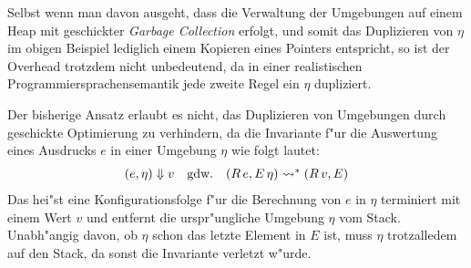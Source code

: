 \documentclass[12pt,a4paper]{article}
\begin{document}
Selbst wenn man davon ausgeht, dass die Verwaltung der Umgebungen auf einem Heap mit geschickter \emph{Garbage
Collection} erfolgt, und somit das Duplizieren von $\eta$ im obigen Beispiel lediglich einem Kopieren eines
Pointers entspricht, so ist der Overhead trotzdem nicht unbedeutend, da in einer realistischen
Programmiersprachensemantik jede zweite Regel ein $\eta$ dupliziert.

Der bisherige Ansatz erlaubt es nicht, das Duplizieren von Umgebungen durch geschickte Optimierung zu
verhindern, da die Invariante f"ur die Auswertung eines Ausdrucks $e$ in einer Umgebung $\eta$ wie
folgt lautet:
\[\begin{array}{rcl}
  (e,\eta) \Downarrow v & \text{gdw.} & (R\,e,E\,\eta) \rightsquigarrow^* (R\,v,E)
\end{array}\]
Das hei"st eine Konfigurationsfolge f"ur die Berechnung von $e$ in $\eta$ terminiert mit einem Wert $v$
und entfernt die urspr"ungliche Umgebung $\eta$ vom Stack. Unabh"angig davon, ob $\eta$ schon das letzte
Element in $E$ ist, muss $\eta$ trotzalledem auf den Stack, da sonst die Invariante verletzt w"urde.
\end{document}
